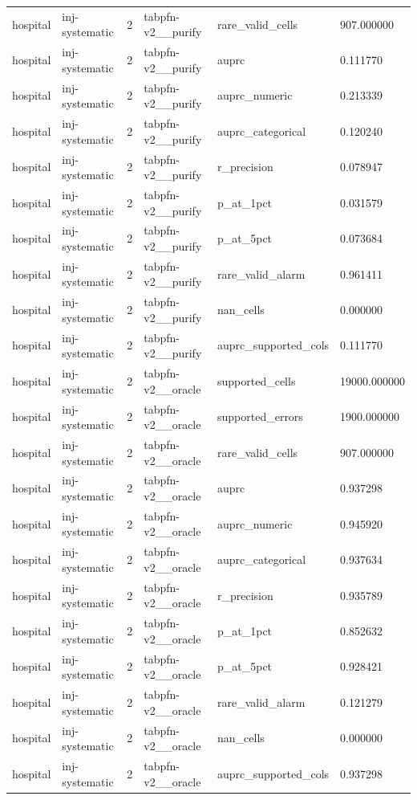 \begin{tabular}{llllll}
hospital & inj-systematic & 2 & tabpfn-v2\_\_purify & rare\_valid\_cells & 907.000000 \\
hospital & inj-systematic & 2 & tabpfn-v2\_\_purify & auprc & 0.111770 \\
hospital & inj-systematic & 2 & tabpfn-v2\_\_purify & auprc\_numeric & 0.213339 \\
hospital & inj-systematic & 2 & tabpfn-v2\_\_purify & auprc\_categorical & 0.120240 \\
hospital & inj-systematic & 2 & tabpfn-v2\_\_purify & r\_precision & 0.078947 \\
hospital & inj-systematic & 2 & tabpfn-v2\_\_purify & p\_at\_1pct & 0.031579 \\
hospital & inj-systematic & 2 & tabpfn-v2\_\_purify & p\_at\_5pct & 0.073684 \\
hospital & inj-systematic & 2 & tabpfn-v2\_\_purify & rare\_valid\_alarm & 0.961411 \\
hospital & inj-systematic & 2 & tabpfn-v2\_\_purify & nan\_cells & 0.000000 \\
hospital & inj-systematic & 2 & tabpfn-v2\_\_purify & auprc\_supported\_cols & 0.111770 \\
hospital & inj-systematic & 2 & tabpfn-v2\_\_oracle & supported\_cells & 19000.000000 \\
hospital & inj-systematic & 2 & tabpfn-v2\_\_oracle & supported\_errors & 1900.000000 \\
hospital & inj-systematic & 2 & tabpfn-v2\_\_oracle & rare\_valid\_cells & 907.000000 \\
hospital & inj-systematic & 2 & tabpfn-v2\_\_oracle & auprc & 0.937298 \\
hospital & inj-systematic & 2 & tabpfn-v2\_\_oracle & auprc\_numeric & 0.945920 \\
hospital & inj-systematic & 2 & tabpfn-v2\_\_oracle & auprc\_categorical & 0.937634 \\
hospital & inj-systematic & 2 & tabpfn-v2\_\_oracle & r\_precision & 0.935789 \\
hospital & inj-systematic & 2 & tabpfn-v2\_\_oracle & p\_at\_1pct & 0.852632 \\
hospital & inj-systematic & 2 & tabpfn-v2\_\_oracle & p\_at\_5pct & 0.928421 \\
hospital & inj-systematic & 2 & tabpfn-v2\_\_oracle & rare\_valid\_alarm & 0.121279 \\
hospital & inj-systematic & 2 & tabpfn-v2\_\_oracle & nan\_cells & 0.000000 \\
hospital & inj-systematic & 2 & tabpfn-v2\_\_oracle & auprc\_supported\_cols & 0.937298 \\

\end{tabular}
